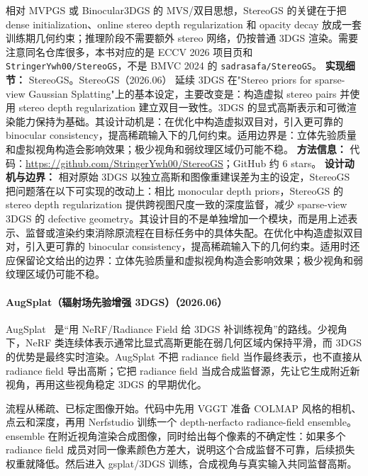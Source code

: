 相对 MVPGS 或 Binocular3DGS 的 MVS/双目思想，StereoGS 的关键在于把 dense initialization、online stereo depth regularization 和 opacity decay 放成一套训练期几何约束；推理阶段不需要额外 stereo 网络，仍按普通 3DGS 渲染。需要注意同名仓库很多，本书对应的是 ECCV 2026 项目页和 \texttt{StringerYwh00/StereoGS}，不是 BMVC 2024 的 \texttt{sadrasafa/StereoGS}。
\textbf{实现细节：} StereoGS。StereoGS（2026.06） 延续 3DGS 在"Stereo priors for sparse-view Gaussian Splatting"上的基本设定，主要改变是：构造虚拟 stereo pairs 并使用 stereo depth regularization 建立双目一致性。3DGS 的显式高斯表示和可微渲染能力保持为基础。其设计动机是：在优化中构造虚拟双目对，引入更可靠的 binocular consistency，提高稀疏输入下的几何约束。适用边界是：立体先验质量和虚拟视角构造会影响效果；极少视角和弱纹理区域仍可能不稳。
\textbf{方法信息：} 代码：\url{https://github.com/StringerYwh00/StereoGS}；GitHub 约 6 stars。
\textbf{设计动机与边界：} 相对原始 3DGS 以独立高斯和图像重建误差为主的设定，StereoGS 把问题落在以下可实现的改动上：相比 monocular depth priors，StereoGS 的 stereo depth regularization 提供跨视图尺度一致的深度监督，减少 sparse-view 3DGS 的 defective geometry。其设计目的不是单独增加一个模块，而是用上述表示、监督或渲染约束消除原流程在目标任务中的具体失配。在优化中构造虚拟双目对，引入更可靠的 binocular consistency，提高稀疏输入下的几何约束。适用时还应保留论文给出的边界：立体先验质量和虚拟视角构造会影响效果；极少视角和弱纹理区域仍可能不稳。
\paragraph{AugSplat（辐射场先验增强 3DGS）（2026.06）}
AugSplat~\cite{2606_31556} 是“用 NeRF/Radiance Field 给 3DGS 补训练视角”的路线。少视角下，NeRF 类连续体表示通常比显式高斯更能在弱几何区域内保持平滑，而 3DGS 的优势是最终实时渲染。AugSplat 不把 radiance field 当作最终表示，也不直接从 radiance field 导出高斯；它把 radiance field 当成合成监督源，先让它生成附近新视角，再用这些视角稳定 3DGS 的早期优化。

流程从稀疏、已标定图像开始。代码中先用 VGGT 准备 COLMAP 风格的相机、点云和深度，再用 Nerfstudio 训练一个 depth-nerfacto radiance-field ensemble。ensemble 在附近视角渲染合成图像，同时给出每个像素的不确定性：如果多个 radiance field 成员对同一像素颜色方差大，说明这个合成监督不可靠，后续损失权重就降低。然后进入 gsplat/3DGS 训练，合成视角与真实输入共同监督高斯。

